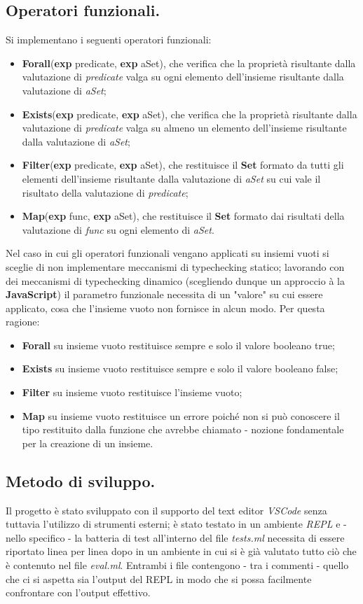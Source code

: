 \documentclass[10pt, italian, openany]{book}
\begin{document}
\subsection*{Operatori funzionali.}
Si implementano i seguenti operatori funzionali:
\begin{itemize}
\item \textbf{For\textunderscore all}(\textbf{exp} predicate, \textbf{exp} aSet), che verifica che la propriet\`a risultante dalla valutazione di \textit{predicate} valga su ogni elemento dell'insieme risultante dalla valutazione di \textit{aSet};
\item \textbf{Exists}(\textbf{exp} predicate, \textbf{exp} aSet), che verifica che la propriet\`a risultante dalla valutazione di \textit{predicate} valga su almeno un elemento dell'insieme risultante dalla valutazione di \textit{aSet};
\item \textbf{Filter}(\textbf{exp} predicate, \textbf{exp} aSet), che restituisce il \textbf{Set} formato da tutti gli elementi dell'insieme risultante dalla valutazione di \textit{aSet} su cui vale il risultato della valutazione di \textit{predicate};
\item \textbf{Map}(\textbf{exp} func, \textbf{exp} aSet), che restituisce il \textbf{Set} formato dai risultati della valutazione di \textit{func} su ogni elemento di \textit{aSet}.
\end{itemize}
Nel caso in cui gli operatori funzionali vengano applicati su insiemi vuoti si sceglie di non implementare meccanismi di typechecking statico; lavorando con dei meccanismi di typechecking dinamico (scegliendo dunque un approccio \`a la \textbf{JavaScript}) il parametro funzionale necessita di un "valore" su cui essere applicato, cosa che l'insieme vuoto non fornisce in alcun modo. Per questa ragione:
\begin{itemize}
    \item \textbf{For\textunderscore all} su insieme vuoto restituisce sempre e solo il valore booleano true;
    \item \textbf{Exists} su insieme vuoto restituisce sempre e solo il valore booleano false;
    \item \textbf{Filter} su insieme vuoto restituisce l'insieme vuoto;
    \item \textbf{Map} su insieme vuoto restituisce un errore poich\'e non si pu\`o conoscere il tipo restituito dalla funzione che avrebbe chiamato - nozione fondamentale per la creazione di un insieme.
\end{itemize}

\subsection*{Metodo di sviluppo.}
Il progetto \`e stato sviluppato con il supporto del text editor \textit{VSCode} senza tuttavia l'utilizzo di strumenti esterni; \`e stato testato in un ambiente \textit{REPL} e - nello specifico - la batteria di test all'interno del file \textit{tests.ml} necessita di essere riportato linea per linea dopo in un ambiente in cui si \`e gi\`a valutato tutto ci\`o che \`e contenuto nel file \textit{eval.ml}. Entrambi i file contengono - tra i commenti - quello che ci si aspetta sia l'output del REPL in modo che si possa facilmente confrontare con l'output effettivo.
\end{document}
